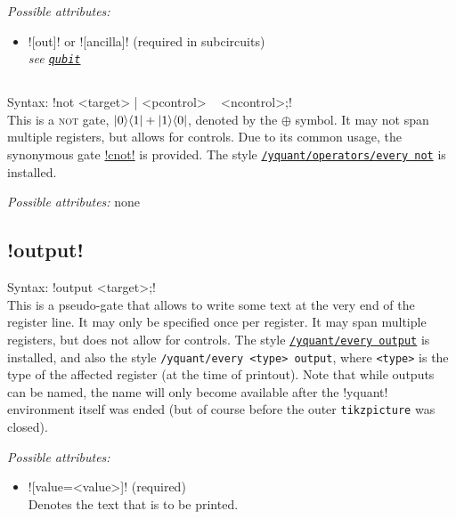 \documentclass{scrartcl}
\def\gate#1{\hyperref[gate:#1]{\texttt{#1}}}
\def\style#1{\hyperref[style:#1]{\texttt{#1}}}
\def\ketbra#1#2{\ket{#1}\!\bra{#2}}
\begin{document}
         \emph{Possible attributes:}
         \begin{itemize}
            \item {}\yquant![out]! or \yquant![ancilla]! (required in subcircuits) \\
               \emph{see \gate{qubit}}
         \end{itemize}

      \subsection{\texorpdfstring{}{not}}\label{gate:not}
         Syntax: \yquant!not <target> | <pcontrol> ~ <ncontrol>;! \\
         This is a \textsc{not} gate, $\ketbra01 + \ketbra10$, denoted by the $\oplus$ symbol.
         It may not span multiple registers, but allows for controls.
         Due to its common usage, the synonymous gate \hyperref[gate:cnot]{\yquant!cnot!} is provided.
         The style \style{/yquant/operators/every not} is installed.

         \emph{Possible attributes:} none

      \subsection[\texorpdfstring{\yquant{output}}{output}]{\yquant!output!}\label{gate:output}
         Syntax: \yquant!output <target>;! \\
         This is a pseudo\hyp gate that allows to write some text at the very end of the register line.
         It may only be specified once per register.
         It may span multiple registers, but does not allow for controls.
         The style \style{/yquant/every output} is installed, and also the style \texttt{/yquant/every <type> output}, where \texttt{<type>} is the type of the affected register (at the time of printout).
         Note that while outputs can be named, the name will only become available after the \tex!yquant! environment itself was ended (but of course before the outer \texttt{tikzpicture} was closed).

         \emph{Possible attributes:}
         \begin{itemize}
            \item \yquant![value=<value>]! (required) \\
               Denotes the text that is to be printed.
         \end{itemize}
\end{document}
